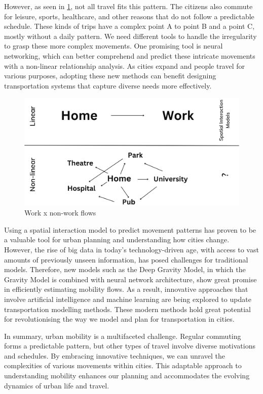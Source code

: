     However, as seen in \ref{fig: context}, not all travel fits this pattern. The citizens also commute for leisure, sports, healthcare, and other reasons that do not follow a predictable schedule. These kinds of trips have a complex point A to point B and a point C, mostly without a daily pattern. We need different tools to handle the irregularity to grasp these more complex movements. One promising tool is neural networking, which can better comprehend and predict these intricate movements with a non-linear relationship analysis. As cities expand and people travel for various purposes, adopting these new methods can benefit designing transportation systems that capture diverse needs more effectively.
   
    \begin{figure}[H]
        \centering
        \includegraphics[width=12cm]{Images/context.png}
        \caption{Work x non-work flows}
        \label{fig: context}
    \end{figure}

   Using a spatial interaction model to predict movement patterns has proven to be a valuable tool for urban planning and understanding how cities change\citep{wilsonFamilySpatialInteraction1971b}. However, the rise of big data in today's technology-driven age, with access to vast amounts of previously unseen information, has posed challenges for traditional models. Therefore, new models such as the Deep Gravity Model, in which the Gravity Model is combined with neural network architecture, show great promise in efficiently estimating mobility flows. As a result, innovative approaches that involve artificial intelligence and machine learning are being explored to update transportation modelling methods. These modern methods hold great potential for revolutionising the way we model and plan for transportation in cities.

    In summary, urban mobility is a multifaceted challenge. Regular commuting forms a predictable pattern, but other types of travel involve diverse motivations and schedules. By embracing innovative techniques, we can unravel the complexities of various movements within cities. This adaptable approach to understanding mobility enhances our planning and accommodates the evolving dynamics of urban life and travel.
    
